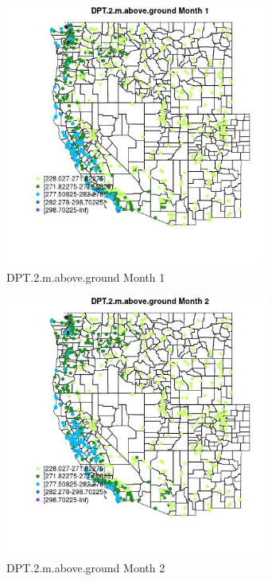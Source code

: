 \begin{figure} 
\centering  
\includegraphics[width=0.77\textwidth]{Code_Outputs/Report_ML_input_PM25_Step4_part_f_de_duplicated_aves_prioritize_24hr_obswNAs_MapObsMo1DPT2maboveground.jpg} 
\caption{\label{fig:Report_ML_input_PM25_Step4_part_f_de_duplicated_aves_prioritize_24hr_obswNAsMapObsMo1DPT2maboveground}DPT.2.m.above.ground Month 1} 
\end{figure} 
 

\begin{figure} 
\centering  
\includegraphics[width=0.77\textwidth]{Code_Outputs/Report_ML_input_PM25_Step4_part_f_de_duplicated_aves_prioritize_24hr_obswNAs_MapObsMo2DPT2maboveground.jpg} 
\caption{\label{fig:Report_ML_input_PM25_Step4_part_f_de_duplicated_aves_prioritize_24hr_obswNAsMapObsMo2DPT2maboveground}DPT.2.m.above.ground Month 2} 
\end{figure} 
 

